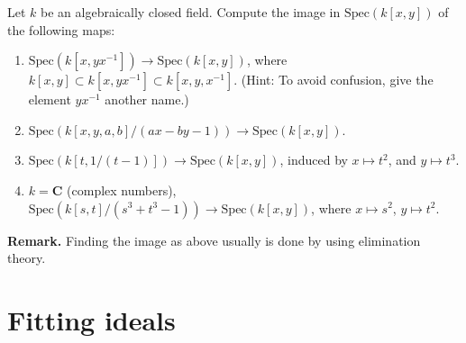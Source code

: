\begin{exercise}
Let $k$ be an algebraically closed field. Compute the image in
$\text{Spec}(k[x,y])$
of the following maps:
\begin{enumerate}
\item $\text{Spec}(k[x,yx^{-1}]) \to \text{Spec}(k[x,y])$, where
$k[x,y] \subset k[x,yx^{-1}] \subset k[x,y,x^{-1}]$.
(Hint: To avoid confusion, give the element $yx^{-1}$ another name.)
\item $\text{Spec}(k[x,y,a,b]/(ax-by-1))\to \text{Spec}(k[x,y])$.
\item $\text{Spec}(k[t,1/(t-1)]) \to \text{Spec}(k[x,y])$, induced by $x \mapsto t^2$,
and $y \mapsto t^3$.
\item $k={\mathbf C}$ (complex numbers),
$\text{Spec}(k[s,t]/(s^3+t^3-1)) \to \text{Spec}(k[x,y])$, where
$x\mapsto s^2$, $y \mapsto t^2$.
\end{enumerate}
\end{exercise}

\begin{exercise}
{\bf Remark.} Finding the image as above usually is done by using
elimination theory.
\end{exercise}




\section{Fitting ideals}
\label{section-fitting-ideals}

